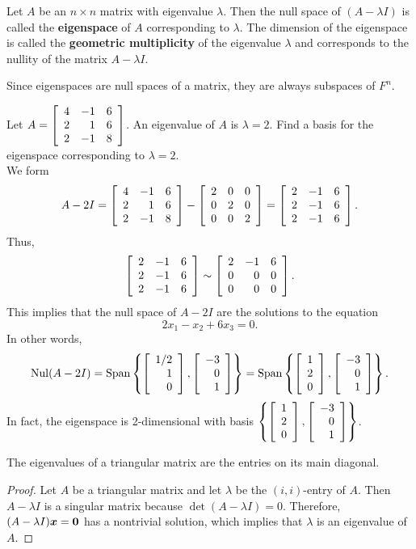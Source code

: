 \begin{Def} Let $A$ be an $n\times n$ matrix with eigenvalue $\lambda$. Then the null space of $(A-\lambda I)$ is called the \textbf{eigenspace} of $A$ corresponding to $\lambda$. The dimension of the eigenspace is called the \textbf{geometric multiplicity} of the eigenvalue $\lambda$ and corresponds to the nullity of the matrix $A-\lambda I$.
\end{Def}\vs

Since eigenspaces are null spaces of a matrix, they are always subspaces of $F^n$.\\

\begin{Exam} Let $A = \mtx{rrr}{4&-1&6\\2&1&6\\2&-1&8}$. An eigenvalue of $A$ is $\lambda =2$. Find a basis for the eigenspace corresponding to $\lambda =2$.\\

We form 
\[A-2I = \mtx{rrr}{4&-1&6\\2&1&6\\2&-1&8} - \mtx{rrr}{2&0&0\\0&2&0\\0&0&2} = \mtx{rrr}{2&-1&6\\2&-1&6\\2&-1&6}.\] Thus, 
\[\mtx{rrr}{2&-1&6\\2&-1&6\\2&-1&6} \sim \mtx{rrr}{2&-1&6\\0&0&0\\0&0&0}.\] This implies that the null space of $A-2I$ are the solutions to the equation 
\[2x_1 -x_2+6x_3=0.\] In other words, 
\[\nul(A-2I) = \Span\left\{\vr{1/2\\1\\0}, \vr{-3\\0\\1}\right\} = \Span\left\{\vr{1\\2\\0}, \vr{-3\\0\\1}\right\}.\] In fact, the eigenspace is 2-dimensional with basis $\left\{\vr{1\\2\\0}, \vr{-3\\0\\1}\right\}$.
\end{Exam}\vs

\begin{Thm} The eigenvalues of a triangular matrix are the entries on its main diagonal.
\end{Thm}
\begin{proof}
Let $A$ be a triangular matrix and let $\lambda$ be the $(i,i)$-entry of $A$. Then $A-\lambda I$ is a singular matrix because $\det(A-\lambda I) = 0$. Therefore, $(A-\lambda I)\bb x = \bb 0$ has a nontrivial solution, which implies that $\lambda$ is an eigenvalue of $A$.
\end{proof}\vs


